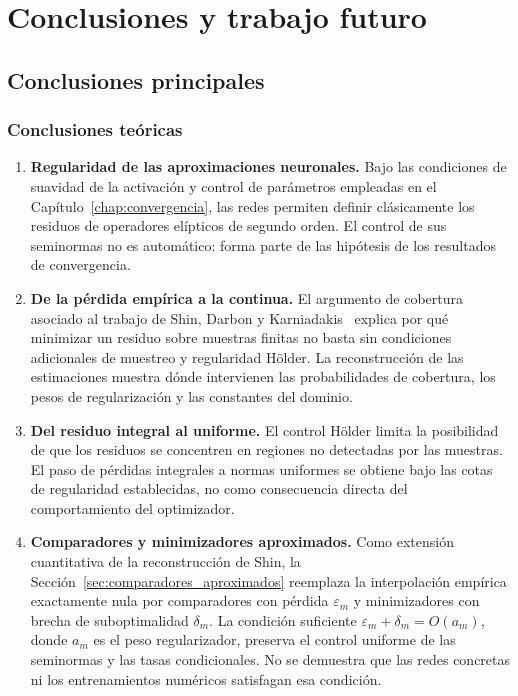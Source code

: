 \chapter{Conclusiones y trabajo futuro}
\label{chap:conclusiones}

\section{Conclusiones principales}

\subsection{Conclusiones teóricas}

\begin{enumerate}
\item \textbf{Regularidad de las aproximaciones neuronales.} Bajo las condiciones de suavidad de la activación y control de parámetros empleadas en el Capítulo~\ref{chap:convergencia}, las redes permiten definir clásicamente los residuos de operadores elípticos de segundo orden. El control de sus seminormas no es automático: forma parte de las hipótesis de los resultados de convergencia.

\item \textbf{De la pérdida empírica a la continua.} El argumento de cobertura asociado al trabajo de Shin, Darbon y Karniadakis~\cite{shin2020convergence} explica por qué minimizar un residuo sobre muestras finitas no basta sin condiciones adicionales de muestreo y regularidad H\"older. La reconstrucción de las estimaciones muestra dónde intervienen las probabilidades de cobertura, los pesos de regularización y las constantes del dominio.

\item \textbf{Del residuo integral al uniforme.} El control H\"older limita la posibilidad de que los residuos se concentren en regiones no detectadas por las muestras. El paso de pérdidas integrales a normas uniformes se obtiene bajo las cotas de regularidad establecidas, no como consecuencia directa del comportamiento del optimizador.

\item \textbf{Comparadores y minimizadores aproximados.} Como extensión cuantitativa de la reconstrucción de Shin, la Sección~\ref{sec:comparadores_aproximados} reemplaza la interpolación empírica exactamente nula por comparadores con pérdida $\varepsilon_m$ y minimizadores con brecha de suboptimalidad $\delta_m$. La condición suficiente $\varepsilon_m+\delta_m=O(a_m)$, donde $a_m$ es el peso regularizador, preserva el control uniforme de las seminormas y las tasas condicionales. No se demuestra que las redes concretas ni los entrenamientos numéricos satisfagan esa condición.


\end{enumerate}
